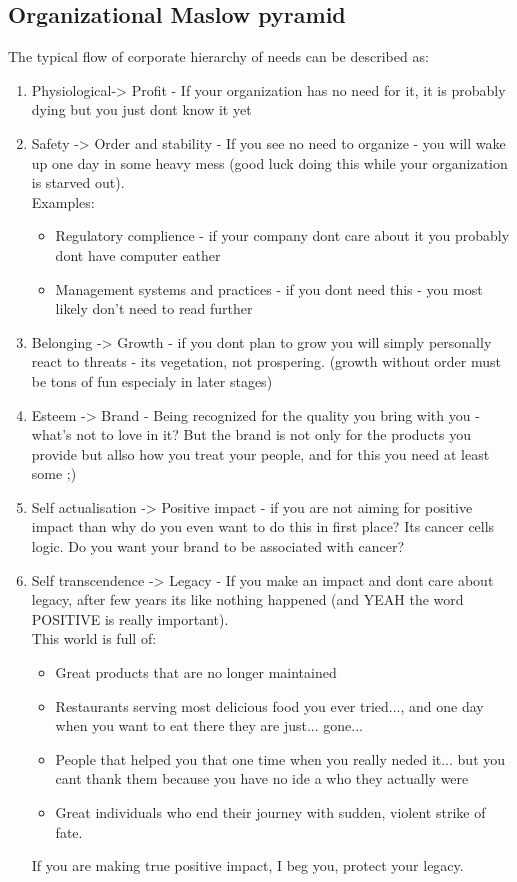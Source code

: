 \documentclass[12pt,a4paper,twoside]{article}
\begin{document}
\subsection{Organizational Maslow pyramid}
The typical flow of corporate hierarchy of needs can be described as:
\begin{enumerate}
  \item Physiological-> Profit - If your organization has no need for it, it is probably dying but you just dont know it yet
  \item Safety -> Order and stability - If you see no need to organize - you will wake up one day in some heavy mess (good luck doing this while your organization is starved out). \\Examples:
  \begin{itemize}
    \item Regulatory complience - if your company dont care about it you probably dont have computer eather
    \item Management systems and practices - if you dont need this - you most likely don't need to read further
  \end{itemize} 
  \item Belonging -> Growth - if you dont plan to grow you will simply personally react to threats - its vegetation, not prospering. (growth  without order must be tons of fun especialy in later stages)
  \item Esteem -> Brand - Being recognized for the quality you bring with you - what's not to love in it? But the brand is not only for the products you provide but allso how you treat your people, and for this you need at least some ;)
  \item Self actualisation -> Positive impact - if you are not aiming for positive impact than why do you even want to do this in first place? Its cancer cells logic. Do you want your brand to be associated with cancer?
  \item Self transcendence -> Legacy - If you make an impact and dont care about legacy, after few years its like nothing happened (and YEAH the word POSITIVE is really important). \\This world is full of:
  \begin{itemize}
    \item Great products that are no longer maintained
    \item Restaurants serving most delicious food you ever tried..., and one day when you want to eat there they are just... gone...
    \item People that helped you that one time when you really neded it... but you cant thank them because you have no ide a who they actually were 
    \item Great individuals who end their journey with sudden, violent strike of fate.
  \end{itemize} 
  If you are making true positive impact, I beg you, protect your legacy.
\end{enumerate} 
\newpage
\end{document}
